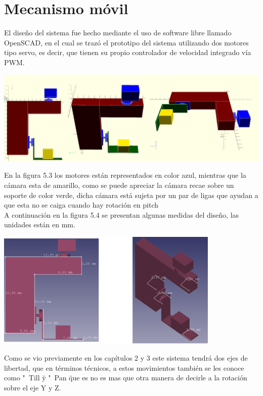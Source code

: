 \section{Mecanismo móvil}
El diseño del sistema fue hecho mediante el uso de software libre llamado OpenSCAD, en el cual se trazó el prototipo del
sistema utilizando dos motores tipo servo, es decir, que tienen su propio controlador de velocidad integrado vía PWM.
\begin{center}
	\includegraphics[width=1.0\textwidth]{Contenido/Cuerpo/Capitulo5/Fig14.eps}
	\label{Fig1}
\end{center}
En la figura 5.3 los motores están representados en color azul, mientras que la cámara esta de amarillo, como se puede apreciar
la cámara recae sobre un soporte de color verde, dicha cámara está sujeta por un par de ligas que ayudan a que esta no se
caiga cuando hay rotación en pitch\\
A continuación en la figura 5.4 se presentan algunas medidas del diseño, las unidades están en mm.
\begin{center}
	\includegraphics[width=0.8\textwidth]{Contenido/Cuerpo/Capitulo5/Fig16.eps}
	\label{Fig1}
\end{center}
Como se vio previamente en los capítulos 2 y 3 este sistema tendrá dos ejes de libertad, que en términos técnicos, a estos
movimientos también se les conoce como "\ Till \" y "\ Pan \" que es no es mas que otra manera de decirle a la rotación
sobre el eje Y y Z.\\
